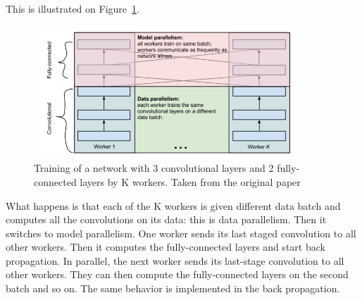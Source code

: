 This is illustrated on Figure~\ref{fig:alexnet}. 
\begin{figure}[!htp]
    \centering
        \includegraphics[width=0.9\textwidth]{figures/02-alexnet}
        \caption[AlexNet architecure overview]{Training of a network with 3 convolutional layers and 2 fully-connected layers by K workers. Taken from the original paper \cite{alexpaper}}\label{fig:alexnet}
\end{figure}
What happens is that each of the K workers is given different data batch and computes all the convolutions on its data: this is data parallelism. Then it switches to model parallelism. One worker sends its last staged convolution to all other workers.  Then it computes the fully-connected layers and start back propagation. In parallel, the next worker sends its last-stage convolution to all other workers. They can then compute the fully-connected layers on the second batch and so on. The same behavior is implemented in the back propagation. 


